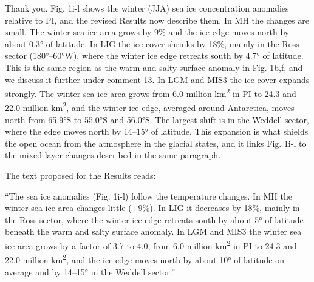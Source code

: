 \response Thank you. Fig. 1i-l shows the winter (JJA) sea ice concentration anomalies relative to PI, and the revised Results now describe them. In MH the changes are small. The winter sea ice area grows by 9\% and the ice edge moves north by about 0.3° of latitude. In LIG the ice cover shrinks by 18\%, mainly in the Ross sector (180°–60°W), where the winter ice edge retreats south by 4.7° of latitude. This is the same region as the warm and salty surface anomaly in Fig. 1b,f, and we discuss it further under comment 13. In LGM and MIS3 the ice cover expands strongly. The winter sea ice area grows from 6.0 million km\textsuperscript{2} in PI to 24.3 and 22.0 million km\textsuperscript{2}, and the winter ice edge, averaged around Antarctica, moves north from 65.9°S to 55.0°S and 56.0°S. The largest shift is in the Weddell sector, where the edge moves north by 14–15° of latitude. This expansion is what shields the open ocean from the atmosphere in the glacial states, and it links Fig. 1i-l to the mixed layer changes described in the same paragraph.

The text proposed for the Results reads:

\begin{change}
``The sea ice anomalies (Fig. 1i-l) follow the temperature changes. In MH the winter sea ice area changes little (+9\%). In LIG it decreases by 18\%, mainly in the Ross sector, where the winter ice edge retreats south by about 5° of latitude beneath the warm and salty surface anomaly. In LGM and MIS3 the winter sea ice area grows by a factor of 3.7 to 4.0, from 6.0 million km\textsuperscript{2} in PI to 24.3 and 22.0 million km\textsuperscript{2}, and the ice edge moves north by about 10° of latitude on average and by 14–15° in the Weddell sector.''
\end{change}

